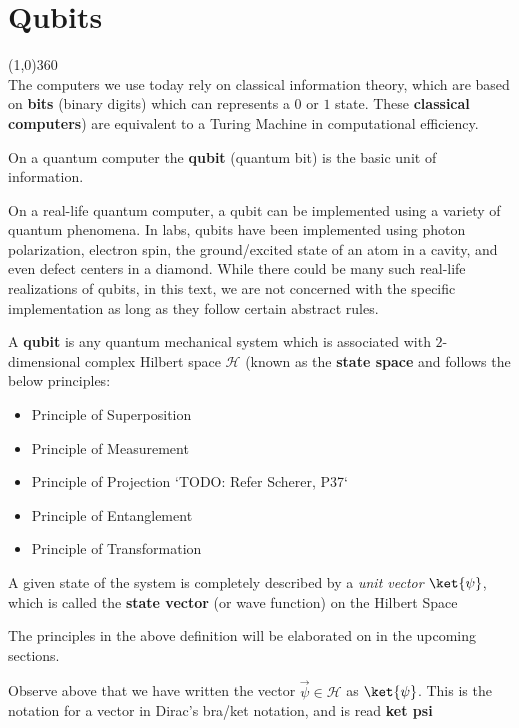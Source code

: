 \chapter{Qubits}
\line(1,0){360} \\

The computers we use today rely on classical information theory, which are based on \textbf{bits} (binary digits) which can represents a $0$ or $1$ state. These \textbf{classical computers}) are equivalent to a Turing Machine in computational efficiency. 

On a quantum computer the \textbf{qubit} (quantum bit) is the basic unit of information.

On a real-life quantum computer, a qubit can be implemented using a variety of quantum phenomena. In labs, qubits have been implemented using photon polarization, electron spin, the ground/excited state of an atom in a cavity, and even defect centers in a diamond. While there could be many such real-life realizations of qubits, in this text, we are not concerned with the specific implementation as long as they follow certain abstract rules.

\begin{samepage}
\begin{defn}[Qubit]
A \textbf{qubit} is any quantum mechanical system which is associated with $2$-dimensional complex Hilbert space $\mathcal{H}$ (known as the \textbf{state space} and follows the below principles:
\begin{itemize}
    \item Principle of Superposition
    \item Principle of Measurement
    \item Principle of Projection `TODO: Refer Scherer, P37`
    \item Principle of Entanglement
    \item Principle of Transformation
\end{itemize}
 A given state of the system is completely described by a
 \textit{unit vector} $\ket{\psi}$, which is called the \textbf{state vector} (or wave function) on the Hilbert Space
\end{defn}
The principles in the above definition will be elaborated on in the upcoming sections.
\end{samepage}

\begin{notation}
    Observe above that we have written the vector $\vec{\psi} \in \mathcal{H}$ as $\ket{\psi}$. This is the notation for a vector in \textnormal{Dirac's bra/ket notation}, and is read \textbf{ket psi}
\end{notation}

